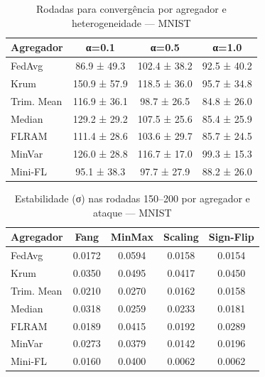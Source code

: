 \begin{table}[H]
\centering
\caption{Rodadas para convergência por agregador e heterogeneidade — MNIST}
\label{tab:convergencia_mnist}
\footnotesize
\setlength{\tabcolsep}{3pt}
\begin{tabular}{@{}lccc@{}}
\toprule
\textbf{Agregador} & \textbf{α=0.1} & \textbf{α=0.5} & \textbf{α=1.0} \\
\midrule
FedAvg & 86.9 ± 49.3 & 102.4 ± 38.2 & 92.5 ± 40.2 \\
Krum & 150.9 ± 57.9 & 118.5 ± 36.0 & 95.7 ± 34.8 \\
Trim. Mean & 116.9 ± 36.1 & 98.7 ± 26.5 & 84.8 ± 26.0 \\
Median & 129.2 ± 29.2 & 107.5 ± 25.6 & 85.4 ± 25.9 \\
FLRAM & 111.4 ± 28.6 & 103.6 ± 29.7 & 85.7 ± 24.5 \\
MinVar & 126.0 ± 28.8 & 116.7 ± 17.0 & 99.3 ± 15.3 \\
Mini-FL & 95.1 ± 38.3 & 97.7 ± 27.9 & 88.2 ± 26.0 \\
\bottomrule
\end{tabular}
\end{table}
\begin{table}[H]
\centering
\caption{Estabilidade (σ) nas rodadas 150--200 por agregador e ataque — MNIST}
\label{tab:estabilidade_mnist}
\footnotesize
\setlength{\tabcolsep}{3pt}
\begin{tabular}{@{}lcccc@{}}
\toprule
\textbf{Agregador} & \textbf{Fang} & \textbf{MinMax} & \textbf{Scaling} & \textbf{Sign-Flip} \\
\midrule
FedAvg & 0.0172 & 0.0594 & 0.0158 & 0.0154 \\
Krum & 0.0350 & 0.0495 & 0.0417 & 0.0450 \\
Trim. Mean & 0.0210 & 0.0270 & 0.0162 & 0.0158 \\
Median & 0.0318 & 0.0259 & 0.0233 & 0.0181 \\
FLRAM & 0.0189 & 0.0415 & 0.0192 & 0.0289 \\
MinVar & 0.0273 & 0.0379 & 0.0142 & 0.0196 \\
Mini-FL & 0.0160 & 0.0400 & 0.0062 & 0.0062 \\
\bottomrule
\end{tabular}
\end{table}
